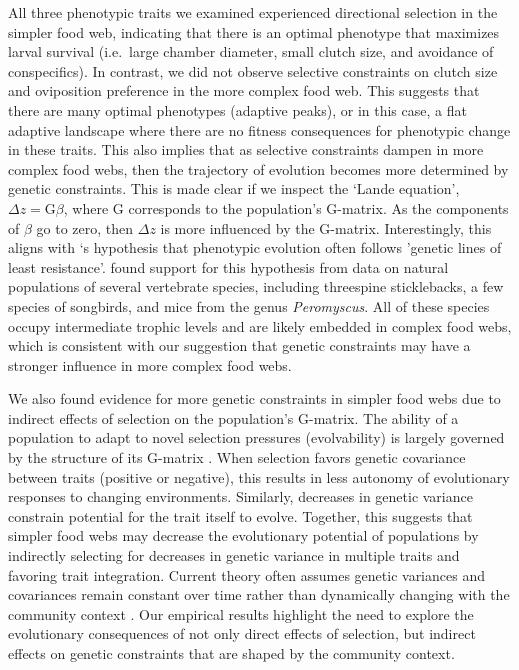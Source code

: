 \documentclass[11pt,]{article}
\begin{document}
All three phenotypic traits we examined experienced directional
selection in the simpler food web, indicating that there is an optimal
phenotype that maximizes larval survival (i.e.~large chamber diameter,
small clutch size, and avoidance of conspecifics). In contrast, we did
not observe selective constraints on clutch size and oviposition
preference in the more complex food web. This suggests that there are
many optimal phenotypes (adaptive peaks), or in this case, a flat
adaptive landscape where there are no fitness consequences for
phenotypic change in these traits. This also implies that as selective
constraints dampen in more complex food webs, then the trajectory of
evolution becomes more determined by genetic constraints. This is made
clear if we inspect the `Lande equation', \(\Delta z = \text{G} \beta\),
where G corresponds to the population's G-matrix. As the components of
\(\beta\) go to zero, then \(\Delta z\) is more influenced by the
G-matrix. Interestingly, this aligns with \citet{Schluter1996}`s
hypothesis that phenotypic evolution often follows 'genetic lines of
least resistance'. \citet{Schluter1996} found support for this
hypothesis from data on natural populations of several vertebrate
species, including threespine sticklebacks, a few species of songbirds,
and mice from the genus \emph{Peromyscus}. All of these species occupy
intermediate trophic levels and are likely embedded in complex food
webs, which is consistent with our suggestion that genetic constraints
may have a stronger influence in more complex food webs.

We also found evidence for more genetic constraints in simpler food webs
due to indirect effects of selection on the population's G-matrix. The
ability of a population to adapt to novel selection pressures
(evolvability) is largely governed by the structure of its G-matrix
\citep{Hansen2008}. When selection favors genetic covariance between
traits (positive or negative), this results in less autonomy of
evolutionary responses to changing environments. Similarly, decreases in
genetic variance constrain potential for the trait itself to evolve.
Together, this suggests that simpler food webs may decrease the
evolutionary potential of populations by indirectly selecting for
decreases in genetic variance in multiple traits and favoring trait
integration. Current theory often assumes genetic variances and
covariances remain constant over time rather than dynamically changing
with the community context \citep{McPeek2017, Guimaraes2017}. Our
empirical results highlight the need to explore the evolutionary
consequences of not only direct effects of selection, but indirect
effects on genetic constraints that are shaped by the community context.
\end{document}

